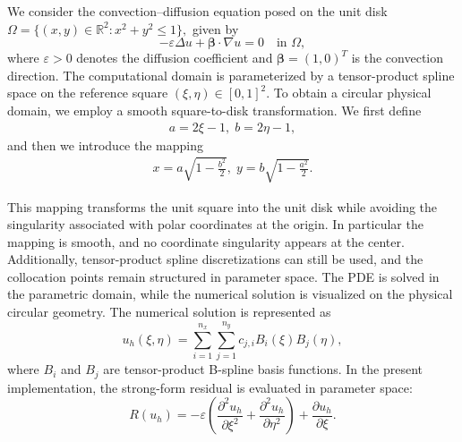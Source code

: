 \documentclass[review]{elsarticle}
\begin{document}
We consider the convection--diffusion equation posed on the unit disk
$
\Omega = \{ (x,y)\in\mathbb{R}^2 : x^2+y^2 \le 1 \},
$
given by
\begin{equation}
-\varepsilon \Delta u + \boldsymbol{\beta}\cdot\nabla u = 0
\quad \text{in } \Omega,
\end{equation}
where $\varepsilon > 0$ denotes the diffusion coefficient and
$
\boldsymbol{\beta} = (1,0)^T
$
is the convection direction.
The computational domain is parameterized by a tensor-product spline space on the reference square
$
(\xi,\eta)\in [0,1]^2.
$
To obtain a circular physical domain, we employ a smooth square-to-disk transformation. We first define
\begin{align}
a = 2\xi - 1, \;
b = 2\eta - 1,
\end{align}
and then we introduce the mapping
\begin{align}
x = a \sqrt{1-\frac{b^2}{2}}, \;
y = b \sqrt{1-\frac{a^2}{2}}.
\end{align}

This mapping transforms the unit square into the unit disk while avoiding the singularity associated with polar coordinates at the origin. In particular the mapping is smooth, and no coordinate singularity appears at the center. Additionally, tensor-product spline discretizations can still be used, and the collocation points remain structured in parameter space.
The PDE is solved in the parametric domain, while the numerical solution is visualized on the physical circular geometry.
The numerical solution is represented as
\begin{equation}
u_h(\xi,\eta)
=
\sum_{i=1}^{n_x}
\sum_{j=1}^{n_y}
c_{j,i}
B_i(\xi) B_j(\eta),
\end{equation}
where $B_i$ and $B_j$ are tensor-product B-spline basis functions.
In the present implementation, the strong-form residual is evaluated in parameter space:
\begin{equation}
R(u_h)
=
-\varepsilon
\left(
\frac{\partial^2 u_h}{\partial \xi^2}
+
\frac{\partial^2 u_h}{\partial \eta^2}
\right)
+
\frac{\partial u_h}{\partial \xi}.
\end{equation}
\end{document}
